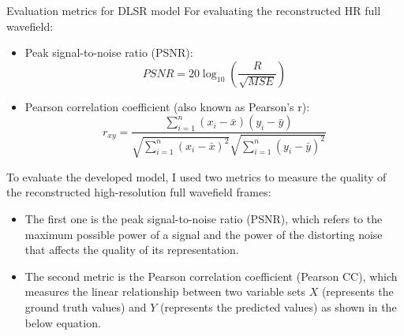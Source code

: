 \documentclass[10pt,aspectratio=169,dvipsnames]{beamer} %
\begin{document}
	\setcounter{subfigure}{0}
	\begin{frame}{Evaluation metrics for DLSR model}
		For evaluating the reconstructed HR full wavefield:
		\begin{itemize}
			\item Peak signal-to-noise ratio (PSNR):
			\begin{equation*}
				PSNR=20\log_{10}\left(\frac{R}{\sqrt{MSE}}\right)
				\label{PSNR_}
			\end{equation*}			
			\item Pearson correlation coefficient (also known as Pearson's r):
			\begin{equation*}
				r_{xy} = \frac{\sum_{i=1}^{n}(x_i - \bar{x})(y_i-\bar{y})}{\sqrt{\sum_{i=1}^{n}(x_i - \bar{x})^2}\sqrt{\sum_{i=1}^{n}(y_i - \bar{y})^2}}
				\label{Pearson_}
			\end{equation*}
		\end{itemize}
	\end{frame}
	\note
	{
		To evaluate the developed model, I used two metrics to measure the quality of the reconstructed high-resolution full wavefield frames:
		\begin{itemize}
			\item The first one is the peak signal-to-noise ratio (PSNR), which refers to the maximum possible power of a signal and the power of the distorting noise that affects the quality of its representation.
%			
			\item The second metric is the Pearson correlation coefficient (Pearson CC), which measures the linear relationship between two
			variable sets \(X\) (represents the ground truth values) and \(Y\) (represents the predicted values) as shown in the below equation.
			
		\end{itemize}
	}
	\setcounter{subfigure}{0}
\end{document}
